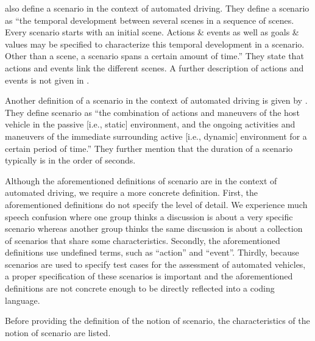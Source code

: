 \textcite{ulbrich2015} also define a scenario in the context of automated driving. They define a scenario as ``the temporal development between several scenes in a sequence of scenes. Every scenario starts with an initial scene. Actions \& events as well as goals \& values may be specified to characterize this temporal development in a scenario. Other than a scene, a scenario spans a certain amount of time.'' They state that actions and events link the different scenes. A further description of actions and events is not given in \cite{ulbrich2015}.

Another definition of a scenario in the context of automated driving is given by \textcite{elrofai2016scenario}. They define scenario as ``the combination of actions and maneuvers of the host vehicle in the passive [i.e., static] environment, and the ongoing activities and maneuvers of the immediate surrounding active [i.e., dynamic] environment for a certain period of time.'' They further mention that the duration of a scenario typically is in the order of seconds.

\cbstart
Although the aforementioned definitions of scenario \cite{geyer2014, ulbrich2015, elrofai2016scenario} are in the context of automated driving, we require a more concrete definition. First, the aforementioned definitions do not specify the level of detail. We experience much speech confusion where one group thinks a discussion is about a very specific scenario whereas another group thinks the same discussion is about a collection of scenarios that share some characteristics. Secondly, the aforementioned definitions use undefined terms, such as ``action'' and ``event''. Thirdly, because scenarios are used to specify test cases for the assessment of automated vehicles, a proper specification of these scenarios is important and the aforementioned definitions are not concrete enough to be directly reflected into a coding language.
\cbend


Before providing the definition of the notion of scenario, the characteristics of the notion of scenario are listed.

